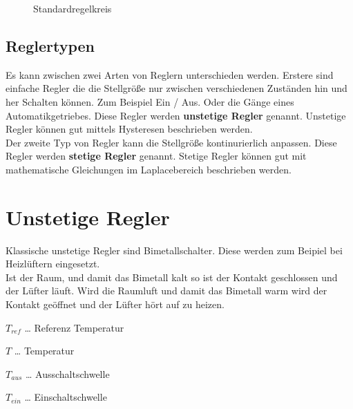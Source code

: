 \documentclass[
  letterpaper,
  DIV=11]{scrreprt}
\begin{document}
\begin{figure}


\caption{\label{fig-Regelkreis}Standardregelkreis}

\end{figure}%

\subsection{Reglertypen}\label{reglertypen}

Es kann zwischen zwei Arten von Reglern unterschieden werden. Erstere
sind einfache Regler die die Stellgröße nur zwischen verschiedenen
Zuständen hin und her Schalten können. Zum Beispiel Ein / Aus. Oder die
Gänge eines Automatikgetriebes. Diese Regler werden \textbf{unstetige
Regler} genannt. Unstetige Regler können gut mittels Hysteresen
beschrieben werden.\\
Der zweite Typ von Regler kann die Stellgröße kontinurierlich anpassen.
Diese Regler werden \textbf{stetige Regler} genannt. Stetige Regler
können gut mit mathematische Gleichungen im Laplacebereich beschrieben
werden.

\section{Unstetige Regler}\label{unstetige-regler}

Klassische unstetige Regler sind Bimetallschalter. Diese werden zum
Beipiel bei Heizlüftern eingesetzt.\\
Ist der Raum, und damit das Bimetall kalt so ist der Kontakt geschlossen
und der Lüfter läuft. Wird die Raumluft und damit das Bimetall warm wird
der Kontakt geöffnet und der Lüfter hört auf zu heizen.

\(T_{ref}\) \ldots{} Referenz Temperatur

\(T\) \ldots{} Temperatur

\(T_{aus}\) \ldots{} Ausschaltschwelle

\(T_{ein}\) \ldots{} Einschaltschwelle
\end{document}
